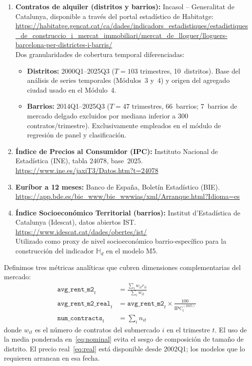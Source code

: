 \documentclass[10pt,a4paper,twocolumn]{article}
\begin{document}
\begin{enumerate}[leftmargin=*,itemsep=2pt]
  \item \textbf{Contratos de alquiler (distritos y barrios):}
    Incasol -- Generalitat de Catalunya, disponible a través del portal estadístico
    de Habitatge:\\ \url{https://habitatge.gencat.cat/ca/dades/indicadors_estadistiques/estadistiques_de_construccio_i_mercat_immobiliari/mercat_de_lloguer/lloguers-barcelona-per-districtes-i-barris/}\\
    Dos granularidades de cobertura temporal diferenciadas:
    \begin{itemize}
      \item \textbf{Distritos:} 2000Q1--2025Q3 ($T{=}103$ trimestres, 10~distritos).
        Base del análisis de series temporales (Módulos~3 y~4) y origen
        del agregado ciudad usado en el Módulo~4.
      \item \textbf{Barrios:} 2014Q1--2025Q3 ($T{=}47$ trimestres, 66~barrios;
        7~barrios de mercado delgado excluidos por mediana inferior a 300
        contratos/trimestre). Exclusivamente empleados en el módulo de
        regresión de panel y clasificación.
    \end{itemize}
  \item \textbf{Índice de Precios al Consumidor (IPC):}
    Instituto Nacional de Estadística (INE), tabla 24078, base~2025.\\
    \url{https://www.ine.es/jaxiT3/Datos.htm?t=24078}
  \item \textbf{Euríbor a 12 meses:}
    Banco de España, Boletín Estadístico (BIE).\\
    \url{https://app.bde.es/bie_www/bie_wwwias/xml/Arranque.html?Idioma=es}
  \item \textbf{Índice Socioeconómico Territorial (barrios):}
    Institut d'Estadística de Catalunya (Idescat), datos abiertos IST.\\
    \url{https://www.idescat.cat/dades/obertes/ist/}\\
    Utilizado como proxy de nivel socioeconómico barrio-específico
    para la construcción del indicador $\mathbb{H}_d$ en el modelo M5.
\end{enumerate}

Definimos tres métricas analíticas que cubren dimensiones complementarias del mercado:
\begin{align}
  \texttt{avg\_rent\_m2}_t &= \frac{\sum_i w_{it} r_{it}}{\sum_i w_{it}}
  \label{eq:nominal}\\
  \texttt{avg\_rent\_m2\_real}_t &= \texttt{avg\_rent\_m2}_t \times \frac{100}{\text{IPC}_t^{(2025)}}
  \label{eq:real}\\
  \texttt{num\_contracts}_t &= \sum_i n_{it}
  \label{eq:vol}
\end{align}
donde $w_{it}$ es el número de contratos del submercado $i$ en el trimestre $t$. El
uso de la media ponderada en~\eqref{eq:nominal} evita el sesgo de composición de
tamaño de distrito. El precio real~\eqref{eq:real} está disponible desde 2002Q1;
los modelos que lo requieren arrancan en esa fecha.
\end{document}
